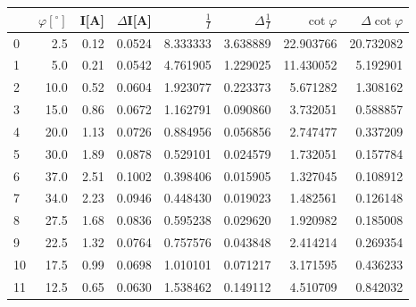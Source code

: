 \begin{tabular}{lrrrrrrr}
\toprule
{} &  $\varphi[^\circ]$ &  I[A] &  $\Delta$I[A] &  $\frac{1}{I}$ &  $\Delta \frac{1}{I}$ &  $\cot{\varphi}$ &  $\Delta \cot{\varphi}$ \\
\midrule
0  &                2.5 &  0.12 &        0.0524 &       8.333333 &              3.638889 &        22.903766 &               20.732082 \\
1  &                5.0 &  0.21 &        0.0542 &       4.761905 &              1.229025 &        11.430052 &                5.192901 \\
2  &               10.0 &  0.52 &        0.0604 &       1.923077 &              0.223373 &         5.671282 &                1.308162 \\
3  &               15.0 &  0.86 &        0.0672 &       1.162791 &              0.090860 &         3.732051 &                0.588857 \\
4  &               20.0 &  1.13 &        0.0726 &       0.884956 &              0.056856 &         2.747477 &                0.337209 \\
5  &               30.0 &  1.89 &        0.0878 &       0.529101 &              0.024579 &         1.732051 &                0.157784 \\
6  &               37.0 &  2.51 &        0.1002 &       0.398406 &              0.015905 &         1.327045 &                0.108912 \\
7  &               34.0 &  2.23 &        0.0946 &       0.448430 &              0.019023 &         1.482561 &                0.126148 \\
8  &               27.5 &  1.68 &        0.0836 &       0.595238 &              0.029620 &         1.920982 &                0.185008 \\
9  &               22.5 &  1.32 &        0.0764 &       0.757576 &              0.043848 &         2.414214 &                0.269354 \\
10 &               17.5 &  0.99 &        0.0698 &       1.010101 &              0.071217 &         3.171595 &                0.436233 \\
11 &               12.5 &  0.65 &        0.0630 &       1.538462 &              0.149112 &         4.510709 &                0.842032 \\
\bottomrule
\end{tabular}
